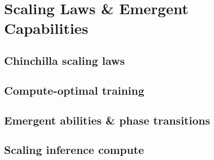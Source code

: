 
\section{Scaling Laws \& Emergent Capabilities}

\subsection{Chinchilla scaling laws}


\subsection{Compute-optimal training}


\subsection{Emergent abilities \& phase transitions}


\subsection{Scaling inference compute}


